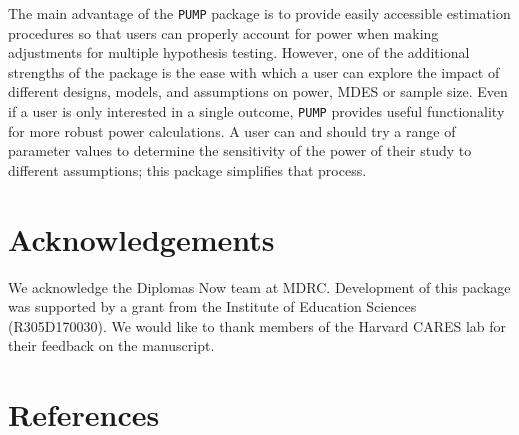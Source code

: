 \documentclass{article}
\begin{document}
The main advantage of the \texttt{PUMP} package is to provide easily
accessible estimation procedures so that users can properly account for
power when making adjustments for multiple hypothesis testing. However,
one of the additional strengths of the package is the ease with which a
user can explore the impact of different designs, models, and
assumptions on power, MDES or sample size. Even if a user is only
interested in a single outcome, \texttt{PUMP} provides useful
functionality for more robust power calculations. A user can and should
try a range of parameter values to determine the sensitivity of the
power of their study to different assumptions; this package simplifies
that process.

\section*{Acknowledgements}

We acknowledge the Diplomas Now team at MDRC. Development of this
package was supported by a grant from the Institute of Education
Sciences (R305D170030). We would like to thank members of the Harvard
CARES lab for their feedback on the manuscript.

\section*{References}
\end{document}
